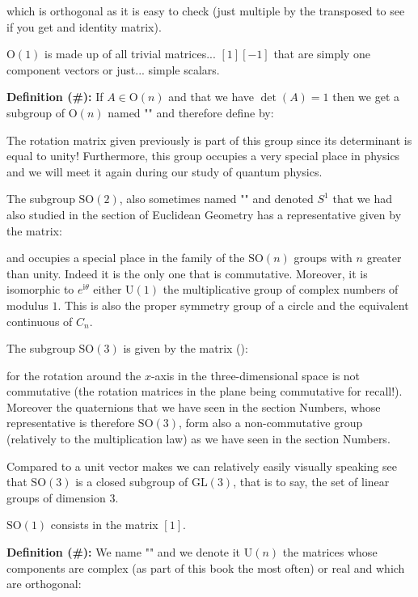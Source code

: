 	which is orthogonal as it is easy to check (just multiple by the transposed to see if you get and identity matrix).
	\begin{tcolorbox}[title=Remark,colframe=black,arc=10pt]
	$\text{O}(1)$ is  made up of all trivial matrices... $[1] [-1]$ that are simply one component vectors or just... simple scalars.
	\end{tcolorbox}
	\textbf{Definition (\#\mydef):} If $A\in \text{O}(n)$ and that we have $\det(A)=1$ then we get a subgroup of $\text{O}(n)$ named "" and therefore define by:
	
	The rotation matrix given previously is part of this group since its determinant is equal to unity! Furthermore, this group occupies a very special place in physics and we will meet it again during our study of quantum physics.
	
	The subgroup $\text{SO}(2)$, also sometimes named "" and denoted $S^1$ that we had also studied in the section of Euclidean Geometry has a representative given by the matrix:
	
	and occupies a special place in the family of the $\text{SO}(n)$ groups  with $n$ greater than unity. Indeed it is the only one that is commutative. Moreover, it is isomorphic to $e^{\mathrm{i}\theta}$ either $\text{U}(1)$ the multiplicative group of complex numbers of modulus $1$. This is also the proper symmetry group of a circle and the equivalent continuous of $C_n$.
	
	The subgroup $\text{SO}(3)$ is given by the matrix ():
	
	for the rotation around the $x$-axis in the three-dimensional space is not commutative (the rotation matrices in the plane being commutative for recall!). Moreover the quaternions that we have seen in the section Numbers, whose representative is therefore $\text{SO}(3)$, form also a non-commutative group (relatively to the multiplication law) as we have seen in the section Numbers.
	
	Compared to a unit vector makes we can relatively easily visually speaking see that $\text{SO} (3)$ is a closed subgroup of $\text{GL} (3)$, that is to say, the set of linear groups of dimension $3$.
	
	\begin{tcolorbox}[title=Remark,colframe=black,arc=10pt]
	$\text{SO} (1)$ consists in the matrix $[1]$.
	\end{tcolorbox}	
	\textbf{Definition (\#\mydef):} We name "" and we denote it $\text{U}(n)$ the matrices whose components are complex (as part of this book the most often) or real and which are orthogonal:
	
